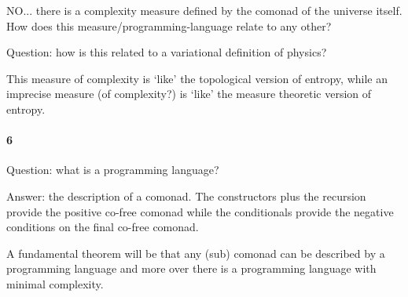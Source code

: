 NO... there is a complexity measure defined by the comonad of the universe
itself. How does this measure/programming-language relate to any other?

Question: how is this related to a variational definition of physics?

This measure of complexity is `like' the topological version of entropy, while
an imprecise measure (of complexity?) is `like' the measure theoretic version
of entropy.

\paragraph{6}

Question: what is a programming language?

Answer: the description of a comonad. The constructors plus the recursion
provide the positive co-free comonad while the conditionals provide the negative
conditions on the final co-free comonad.

A fundamental theorem will be that any (sub) comonad can be described by a
programming language and more over there is a programming language with minimal
complexity.